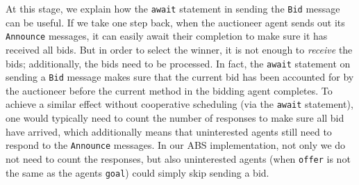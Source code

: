 At this stage, we explain how the \lstinline|await| statement in sending the \lstinline|Bid| message can be useful.
If we take one step back, when the auctioneer agent sends out its \lstinline|Announce| messages, it can easily await their completion to make sure it has received all bids.
But in order to select the winner, it is not enough to {\em receive} the bids; additionally, the bids need to be processed.
In fact, the \lstinline|await| statement on sending a \lstinline|Bid| message makes sure that the current bid has been accounted for by the auctioneer before the current method in the bidding agent completes. 
To achieve a similar effect without cooperative scheduling (via the \lstinline|await| statement), one would typically need to count the number of responses to make sure all bid have arrived, which additionally means that uninterested agents still need to respond to the \lstinline|Announce| messages. 
In our ABS implementation, not only we do not need to count the responses, but also uninterested agents (when \lstinline|offer| is not the same as the agents \lstinline|goal|) could simply skip sending a bid. 

